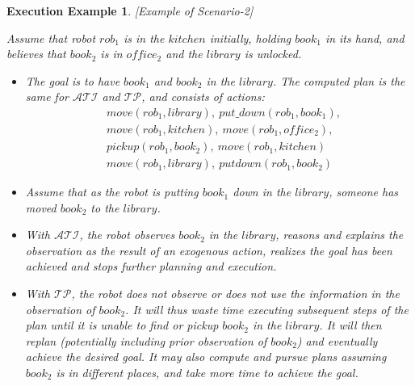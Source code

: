 \documentclass[letterpaper, 10 pt, conference]{article}  %
\newtheorem{execexample}{\bf Execution Example}
\begin{document}
\begin{execexample}\label{exec:example1}[Example of Scenario-2]\\
  {\rm Assume that robot $rob_1$ is in the $kitchen$ initially,
    holding $book_1$ in its hand, and believes that $book_2$ is in
    $office_2$ and the $library$ is unlocked.
    \begin{itemize}
    \item The goal is to have $book_1$ and $book_2$ in the $library$.
      The computed plan is the same for $\mathcal{ATI}$ and
      $\mathcal{TP}$, and consists of actions:
      \begin{align*}
        &move(rob_1, library),~put\_down(rob_1, book_1),\\
        &move(rob_1, kitchen), ~move(rob_1, office_2),\\
        &pickup(rob_1, book_2), ~move(rob_1, kitchen)\\
        &move(rob_1, library), ~putdown(rob_1, book_2)
      \end{align*}
      
    \item Assume that as the robot is putting $book_1$ down in the
      $library$, someone has moved $book_2$ to the $library$.

    \item With $\mathcal{ATI}$, the robot observes $book_2$ in the
      $library$, reasons and explains the observation as the result of
      an exogenous action, realizes the goal has been achieved and
      stops further planning and execution.

    \item With $\mathcal{TP}$, the robot does not observe or does not
      use the information in the observation of $book_2$. It will thus
      waste time executing subsequent steps of the plan until it is
      unable to find or pickup $book_2$ in the $library$. It will then
      replan (potentially including prior observation of $book_2$) and
      eventually achieve the desired goal. It may also compute and
      pursue plans assuming $book_2$ is in different places, and take
      more time to achieve the goal.
    \end{itemize}
  }
\end{execexample}
\end{document}
